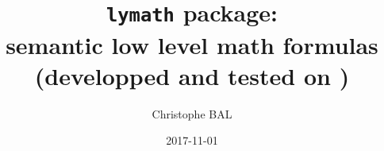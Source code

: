 \documentclass[12pt,a4paper]{article}
\begin{document}
\title{\texttt{lymath} package:\\semantic low level math formulas\\{\footnotesize (developped and tested on \macosxname{})}}
\author{Christophe BAL}
\date{2017-11-01}

\maketitle


\end{document}
